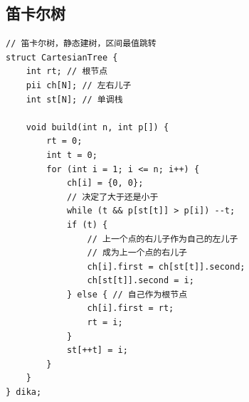 \documentclass[twoside]{article}
\begin{document}
\subsection{笛卡尔树}
\begin{lstlisting}
// 笛卡尔树，静态建树，区间最值跳转
struct CartesianTree {
    int rt; // 根节点
    pii ch[N]; // 左右儿子
    int st[N]; // 单调栈

    void build(int n, int p[]) {
        rt = 0;
        int t = 0;
        for (int i = 1; i <= n; i++) {
            ch[i] = {0, 0};
            // 决定了大于还是小于
            while (t && p[st[t]] > p[i]) --t;
            if (t) { 
                // 上一个点的右儿子作为自己的左儿子
				// 成为上一个点的右儿子
                ch[i].first = ch[st[t]].second;
                ch[st[t]].second = i;
            } else { // 自己作为根节点
                ch[i].first = rt;
                rt = i;
            }
            st[++t] = i;
        }
    }
} dika;
\end{lstlisting}
\end{document}
